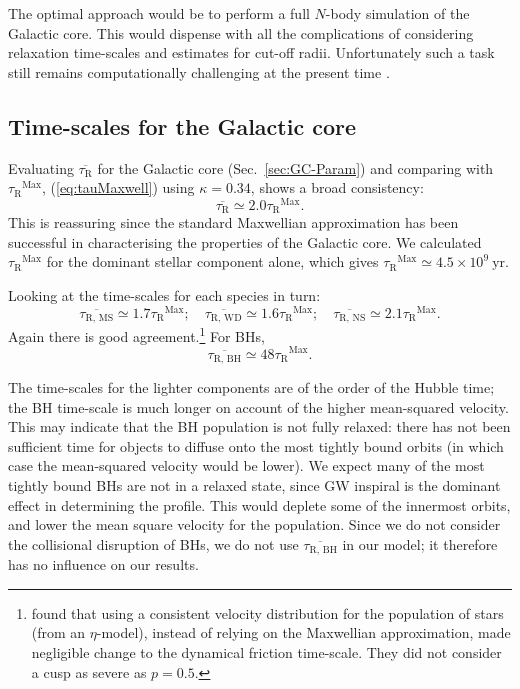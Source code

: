 \documentclass[useAMS,usedcolumn,usegraphicx,usenatbib]{mn2e}
\newcommand{\eqnref}[1]{(\ref{eq:#1})}
\newcommand{\secref}[1]{Sec.~\ref{sec:#1}}
\newcommand{\units}[1]{\ensuremath{~\mathrm{#1}}}
\newcommand{\sub}[1]{\ensuremath{_\mathrm{#1}}}
\newcommand{\super}[1]{\ensuremath{^\mathrm{#1}}}
\begin{document}
\begin{onecolumn}
The optimal approach would be to perform a full $N$-body simulation of the Galactic core. This would dispense with all the complications of considering relaxation time-scales and estimates for cut-off radii. Unfortunately such a task still remains computationally challenging at the present time \citep[e.g.,][]{Li2012}.

\subsection{Time-scales for the Galactic core}\label{sec:tauGC}

Evaluating $\overline{\tau\sub{R}}$ for the Galactic core (\secref{GC-Param}) and comparing with $\tau\sub{R}\super{Max}$, \eqnref{tauMaxwell} using $\kappa = 0.34$, shows a broad consistency:
\begin{equation}
\overline{\tau\sub{R}} \simeq 2.0 \tau\sub{R}\super{Max}.
\end{equation}
This is reassuring since the standard Maxwellian approximation has been successful in characterising the properties of the Galactic core. We calculated $\tau\sub{R}\super{Max}$ for the dominant stellar component alone, which gives $\tau\sub{R}\super{Max}\simeq 4.5 \times 10^9\units{yr}$.

Looking at the time-scales for each species in turn:
\begin{equation}
\overline{\tau\sub{R,\,MS}} \simeq 1.7 \tau\sub{R}\super{Max};\quad \overline{\tau\sub{R,\,WD}} \simeq 1.6 \tau\sub{R}\super{Max};\quad \overline{\tau\sub{R,\,NS}} \simeq 2.1 \tau\sub{R}\super{Max}.
\end{equation}
Again there is good agreement.\footnote{\citet*{Freitag2006} found that using a consistent velocity distribution for the population of stars (from an $\eta$-model), instead of relying on the Maxwellian approximation, made negligible change to the dynamical friction time-scale. They did not consider a cusp as severe as $p = 0.5$.} For BHs,
\begin{equation}
\overline{\tau\sub{R,\,BH}} \simeq 48 \tau\sub{R}\super{Max}.
\end{equation}

The time-scales for the lighter components are of the order of the Hubble time; the BH time-scale is much longer on account of the higher mean-squared velocity. This may indicate that the BH population is not fully relaxed: there has not been sufficient time for objects to diffuse onto the most tightly bound orbits (in which case the mean-squared velocity would be lower). We expect many of the most tightly bound BHs are not in a relaxed state, since GW inspiral is the dominant effect in determining the profile. This would deplete some of the innermost orbits, and lower the mean square velocity for the population. Since we do not consider the collisional disruption of BHs, we do not use $\overline{\tau\sub{R,\,BH}}$ in our model; it therefore has no influence on our results.


\end{onecolumn}
\end{document}
